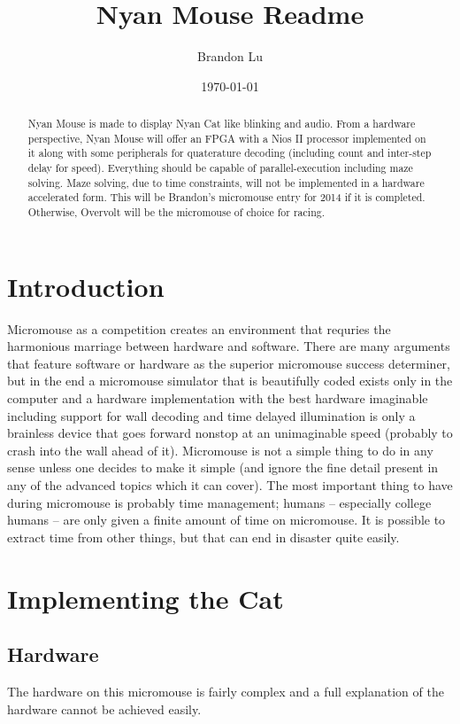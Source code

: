 \documentclass{article}
\begin{document}
\title{Nyan Mouse Readme}
\author {Brandon Lu} \date{\today}
\maketitle
\begin{abstract}
Nyan Mouse is made to display Nyan Cat like blinking and audio.  From a hardware perspective, Nyan Mouse will offer an FPGA with a Nios II processor implemented on it along with some peripherals for quaterature decoding (including count and inter-step delay for speed).  Everything should be capable of parallel-execution including maze solving.  Maze solving, due to time constraints, will not be implemented in a hardware accelerated form.  This will be Brandon's micromouse entry for 2014 if it is completed.  Otherwise, Overvolt will be the micromouse of choice for racing.
\end{abstract}

\section {Introduction}
Micromouse as a competition creates an environment that requries the harmonious marriage between hardware and software.  There are many arguments that feature software or hardware as the superior micromouse success determiner, but in the end a micromouse simulator that is beautifully coded exists only in the computer and a hardware implementation with the best hardware imaginable including support for wall decoding and time delayed illumination is only a brainless device that goes forward nonstop at an unimaginable speed (probably to crash into the wall ahead of it).  Micromouse is not a simple thing to do in any sense unless one decides to make it simple (and ignore the fine detail present in any of the advanced topics which it can cover).  The most important thing to have during micromouse is probably time management; humans -- especially college humans -- are only given a finite amount of time on micromouse.  It is possible to extract time from other things, but that can end in disaster quite easily.

\section {Implementing the Cat}
\subsection {Hardware}
The hardware on this micromouse is fairly complex and a full explanation of the hardware cannot be achieved easily.
\end{document}
